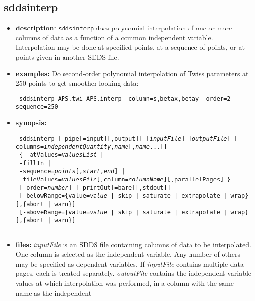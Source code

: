 \newpage
\subsection{sddsinterp}
\label{sddsinterp}

\begin{itemize}
\item {\bf description:}
{\tt sddsinterp} does polynomial interpolation of one or more columns of data as
a function of a common independent variable.  Interpolation may be done at specified
points, at a sequence of points, or at points given in another SDDS file.  
\item {\bf examples:} 
Do second-order polynomial interpolation of Twiss parameters at 250 points
to get smoother-looking data:
\begin{flushleft}{\tt
sddsinterp APS.twi APS.interp -column=s,betax,betay -order=2 -sequence=250
}\end{flushleft}
\item {\bf synopsis:} 
\begin{flushleft}{\tt
sddsinterp [-pipe[=input][,output]] [{\em inputFile}] [{\em outputFile}] 
[-columns={\em independentQuantity},{\em name}[,{\em name}...]] \\ \ 
\{ -atValues={\em valuesList} | \\ \ 
-fillIn | \\ \
-sequence={\em points}[,{\em start},{\em end}] | \\ \ 
-fileValues={\em valuesFile}[,column={\em columnName}][,parallelPages] \}  \\ \ 
[-order={\em number}] [-printOut[=bare][,stdout]] \\ \ 
[-belowRange=\{value={\em value} | skip | saturate | extrapolate | wrap\}[,\{abort | warn\}] \\ \ 
[-aboveRange=\{value={\em value} | skip | saturate | extrapolate | wrap\}[,\{abort | warn\}] \\ \ 
}\end{flushleft}
\item {\bf files:}
{\em inputFile} is an SDDS file containing columns of data to be interpolated.
One column is selected as the independent variable.  Any number of others may
be specified as dependent variables. If {\em inputFile} contains multiple data pages,
each is treated separately.  {\em outputFile} contains the independent variable values
at which interpolation was performed, in a column with the same name as the independent

\end{itemize}
